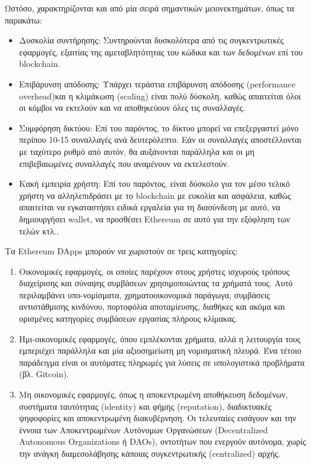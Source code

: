 Ωστόσο, χαρακτηρίζονται και από μία σειρά σημαντικών μειονεκτημάτων, όπως τα παρακάτω:
\begin{itemize}
	\item Δυσκολία συντήρησης: Συντηρούνται δυσκολότερα από τις συγκεντρωτικές εφαρμογές, εξαιτίας της αμεταβλητότητας του κώδικα και των δεδομένων επί του blockchain. 
	\item Επιβάρυνση απόδοσης: Υπάρχει τεράστια επιβάρυνση απόδοσης (performance overhead)και η κλιμάκωση (scaling) είναι πολύ δύσκολη, καθώς απαιτείται όλοι οι κόμβοι να εκτελούν και να αποθηκεύουν όλες τις συναλλαγές.
	\item Συμφόρηση δικτύου: Επί του παρόντος, το δίκτυο μπορεί να επεξεργαστεί μόνο περίπου 10-15 συναλλαγές ανά δευτερόλεπτο. Εάν οι συναλλαγές αποστέλλονται με ταχύτερο ρυθμό από αυτόν, θα αυξάνονται παράλληλα και οι μη επιβεβαιωμένες συναλλαγές που αναμένουν να εκτελεστούν.
	\item Κακή εμπειρία χρήστη: Επί του παρόντος, είναι δύσκολο για τον μέσο τελικό χρήστη να αλληλεπιδράσει με το blockchain με ευκολία και ασφάλεια, καθώς απαιτείται να εγκαταστήσει ειδικά εργαλεία για τη διασύνδεση με αυτό, να δημιουργήσει wallet, να προσθέσει Ethereum σε αυτό για την εξόφληση των τελών κτλ..
\end{itemize}

Τα Ethereum DApps μπορούν να χωριστούν σε τρεις κατηγορίες:
\begin{enumerate}
	\item Οικονομικές εφαρμογές, οι οποίες παρέχουν στους χρήστες ισχυρούς τρόπους διαχείρισης και σύναψης συμβάσεων χρησιμοποιώντας τα χρήματά τους. Αυτό περιλαμβάνει υπο-νομίσματα, χρηματοοικονομικά παράγωγα, συμβάσεις αντιστάθμισης κινδύνου, πορτοφόλια αποταμίευσης, διαθήκες και ακόμα και ορισμένες κατηγορίες συμβάσεων εργασίας πλήρους κλίμακας.
	
	\item Ημι-οικονομικές εφαρμογές, όπου εμπλέκονται χρήματα, αλλά η λειτουργία τους εμπεριέχει παράλληλα και  μία αξιοσημείωτη μη νομισματική πλευρά. Ένα τέτοιο παράδειγμα είναι οι αυτόματες πληρωμές για λύσεις σε υπολογιστικά προβλήματα (βλ. Gitcoin).
	
	\item Μη οικονομικές εφαρμογές, όπως η αποκεντρωμένη αποθήκευση δεδομένων, συστήματα ταυτότητας (identity) και φήμης (reputation), διαδικτυακές ψηφοφορίες και αποκεντρωμένη διακυβέρνηση. Οι τελευταίες εισάγουν και την έννοια των Αποκεντρωμένων Αυτόνομων Οργανώσεων (Decentralized Autonomous Organizations ή DAOs), οντοτήτων που ενεργούν αυτόνομα, χωρίς την ανάγκη διαμεσολάβησης κάποιας συγκεντρωτικής (\textenglish{centralized}) αρχής.\cite{2.6-ethereum-whitepaper}
\end{enumerate}

